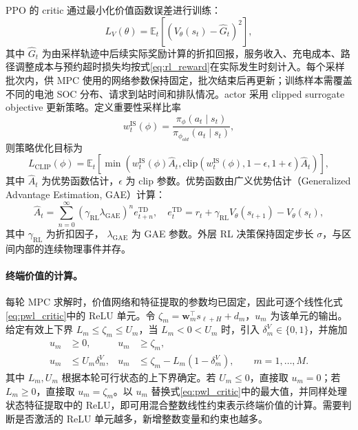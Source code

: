 \documentclass[12pt,a4paper,UTF8]{ctexart}
\begin{document}
PPO 的 critic 通过最小化价值函数误差进行训练：
\begin{equation}
L_V(\theta)=
\mathbb{E}_t\left[
\left(V_{\theta}(s_t)-\hat{G}_t\right)^2
\right],
\label{eq:value_loss}
\end{equation}
其中 $\hat{G}_t$ 为由采样轨迹中后续实际奖励计算的折扣回报，服务收入、充电成本、路径调整成本与预约超时损失均按式\eqref{eq:rl_reward}在实际发生时刻计入。每个采样批次内，供 MPC 使用的网络参数保持固定，批次结束后再更新；训练样本需覆盖不同的电池 SOC 分布、请求到站时间和排队情况。actor 采用 clipped surrogate objective 更新策略。定义重要性采样比率
\begin{equation}
w_t^{\mathrm{IS}}(\phi)=
\frac{\pi_{\phi}(a_t\mid s_t)}{\pi_{\phi_{old}}(a_t\mid s_t)},
\label{eq:ppo_ratio}
\end{equation}
则策略优化目标为
\begin{equation}
L_{\mathrm{CLIP}}(\phi)=
\mathbb{E}_t\left[
\min\left(
w_t^{\mathrm{IS}}(\phi)\hat{A}_t,
\mathrm{clip}(w_t^{\mathrm{IS}}(\phi),1-\epsilon,1+\epsilon)\hat{A}_t
\right)
\right],
\label{eq:ppo_clip}
\end{equation}
其中 $\hat{A}_t$ 为优势函数估计，$\epsilon$ 为 clip 参数。优势函数由广义优势估计（Generalized Advantage Estimation, GAE）计算：
\begin{equation}
\hat{A}_t=\sum_{n=0}^{\infty}
(\gamma_{\mathrm{RL}}\lambda_{\mathrm{GAE}})^n
e_{t+n}^{\mathrm{TD}},
\quad
e_t^{\mathrm{TD}}=r_t
+\gamma_{\mathrm{RL}}V_{\theta}(s_{t+1})-V_{\theta}(s_t),
\label{eq:gae}
\end{equation}
其中 $\gamma_{\mathrm{RL}}$ 为折扣因子，
$\lambda_{\mathrm{GAE}}$ 为 GAE 参数。外层 RL 决策保持固定步长 $\sigma$，与区间内部的连续物理事件并存。

\paragraph{终端价值的计算。}每轮 MPC 求解时，价值网络和特征提取的参数均已固定，因此可逐个线性化式\eqref{eq:pwl_critic}中的 ReLU 单元。令 $\zeta_m=\boldsymbol w_m^\top s_{\ell+H}+d_m$，$u_m$ 为该单元的输出。给定有效上下界 $L_m\le\zeta_m\le U_m$，当 $L_m<0<U_m$ 时，引入 $\delta_m^V\in\{0,1\}$，并施加
\begin{subequations}
\label{eq:pwl_critic_embedding}
\begin{align}
u_m&\ge0,& u_m&\ge\zeta_m,\\
u_m&\le U_m\delta_m^V,&
u_m&\le\zeta_m-L_m(1-\delta_m^V),
\qquad m=1,\ldots,M.
\end{align}
\end{subequations}
其中 $L_m,U_m$ 根据本轮可行状态的上下界确定。若 $U_m\le0$，直接取 $u_m=0$；若 $L_m\ge0$，直接取 $u_m=\zeta_m$。以 $u_m$ 替换式\eqref{eq:pwl_critic}中的最大值，并同样处理状态特征提取中的 ReLU，即可用混合整数线性约束表示终端价值的计算。需要判断是否激活的 ReLU 单元越多，新增整数变量和约束也越多。
\end{document}

